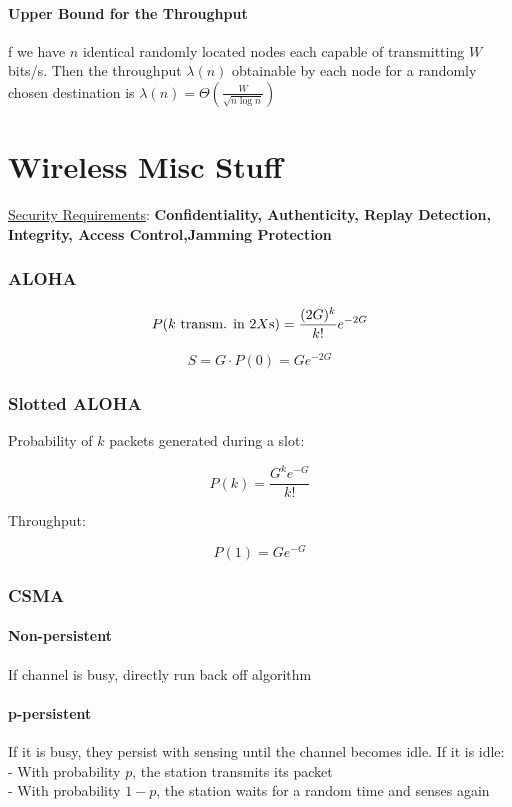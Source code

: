 \documentclass[10pt, a4paper,twocolumn]{scrartcl}
\begin{document}
\paragraph{Upper Bound for the Throughput} 
f we have $n$ identical randomly located nodes each capable of transmitting $W$ bits/s. 
Then the throughput $\lambda(n)$ obtainable by each node for a randomly chosen destination is $\lambda(n) = \Theta\left(\frac W{\sqrt{n\log n}}\right)$


\section{Wireless Misc Stuff}
\underline{Security Requirements}:
\textbf{Confidentiality, Authenticity, Replay Detection, Integrity, Access Control,Jamming Protection}


\subsubsection{ALOHA}
\begin{equation*}
P(k \text{ transm. in } 2X\text s) = \frac{(2G)^k}{k!} e^{-2G}
\end{equation*}

\begin{equation*}
S = G \cdot P(0) = Ge^{-2G}
\end{equation*}

\subsubsection{Slotted ALOHA} 
Probability of $k$ packets generated during a slot:

\begin{equation*}
P(k) = \frac{G^ke^{-G}}{k!}
\end{equation*}

Throughput:

\begin{equation*}
P(1) = Ge^{-G}
\end{equation*}

\subsubsection{CSMA}
\paragraph{Non-persistent} If channel is busy, directly run back off algorithm
\paragraph{p-persistent} If it is busy, they persist with sensing until the channel becomes idle. If it is idle:\\
- With probability $p$, the station transmits its packet\\
- With probability $1-p$, the station waits for a random time and senses again
\end{document}

